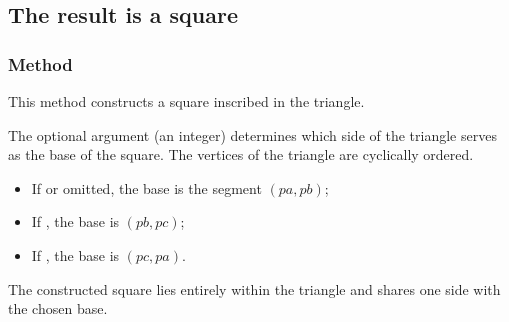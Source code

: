 


\subsection{The result is a square} %


\subsubsection{Method } %
\label{ssub:method_triangle_square__inscribed}

This method constructs a square inscribed in the triangle.

\medskip
\noindent
The optional argument  (an integer) determines which side of the triangle serves as the base of the square. The vertices of the triangle are cyclically ordered.

\begin{itemize}
  \item If  or omitted, the base is the segment $(pa, pb)$;
  \item If , the base is $(pb, pc)$;
  \item If , the base is $(pc, pa)$.
\end{itemize}

\noindent
The constructed square lies entirely within the triangle and shares one side with the chosen base.

\vspace{1em}

\begin{tkzexample}[latex=.5\textwidth]
\end{tkzexample}


